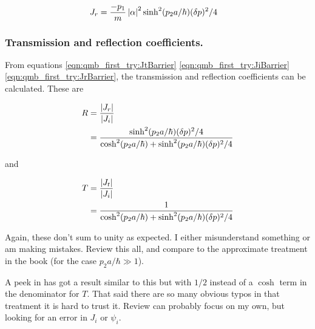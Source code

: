 \begin{align}\label{eqn:qmb_first_try:JrBarrier}
J_r
&= \frac{-p_1}{m} \left\lvert{\alpha}\right\rvert^2 \sinh^2(p_2 a/\hbar) (\delta p)^2/4
\end{align}

\subsubsection{Transmission and reflection coefficients. }

From equations \ref{eqn:qmb_first_try:JtBarrier} \ref{eqn:qmb_first_try:JiBarrier} \ref{eqn:qmb_first_try:JrBarrier}, the transmission and reflection coefficients can be calculated.
These are

\begin{align*}
R &=
\frac{\left\lvert{J_r}\right\rvert} {\left\lvert{J_i}\right\rvert} \\
&=
\frac{\sinh^2(p_2 a/\hbar) (\delta p)^2/4}{ \cosh^2(p_2 a/\hbar) + \sinh^2(p_2 a/\hbar) (\delta p)^2/4 }
\end{align*}

and

\begin{align*}
T &=
\frac{\left\lvert{J_t}\right\rvert} {\left\lvert{J_i}\right\rvert} \\
&=
\frac{1}{ \cosh^2(p_2 a/\hbar) + \sinh^2(p_2 a/\hbar) (\delta p)^2/4 }
\end{align*}

Again, these don't sum to unity as expected.  I either misunderstand something or am making mistakes.  Review this all, and compare to the approximate treatment in the book (for the case $p_2 a/\hbar \gg 1$).

A peek in \cite{mcmahon2005qmd} has got a result similar to this
but with $1/2$ instead of a $\cosh$ term in the denominator for $T$.  That
said there are so many obvious typos in that treatment it is hard 
to trust it.  Review
can probably focus on my own, but looking for an error in $J_i$ or $\psi_i$.

%
%

%

